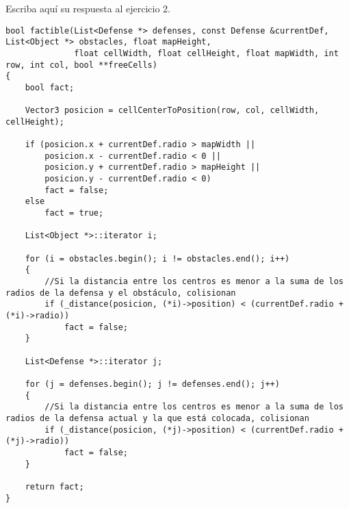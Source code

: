 Escriba aquí su respuesta al ejercicio 2.

\begin{lstlisting}
bool factible(List<Defense *> defenses, const Defense &currentDef, List<Object *> obstacles, float mapHeight,
              float cellWidth, float cellHeight, float mapWidth, int row, int col, bool **freeCells)
{
    bool fact;

    Vector3 posicion = cellCenterToPosition(row, col, cellWidth, cellHeight);

    if (posicion.x + currentDef.radio > mapWidth ||  
        posicion.x - currentDef.radio < 0 ||         
        posicion.y + currentDef.radio > mapHeight || 
        posicion.y - currentDef.radio < 0)           
        fact = false;
    else
        fact = true;

    List<Object *>::iterator i;

    for (i = obstacles.begin(); i != obstacles.end(); i++)
    {
        //Si la distancia entre los centros es menor a la suma de los radios de la defensa y el obstáculo, colisionan
        if (_distance(posicion, (*i)->position) < (currentDef.radio + (*i)->radio))
            fact = false;
    }

    List<Defense *>::iterator j;

    for (j = defenses.begin(); j != defenses.end(); j++)
    {
        //Si la distancia entre los centros es menor a la suma de los radios de la defensa actual y la que está colocada, colisionan
        if (_distance(posicion, (*j)->position) < (currentDef.radio + (*j)->radio))
            fact = false;
    }

    return fact;
}
\end{lstlisting}